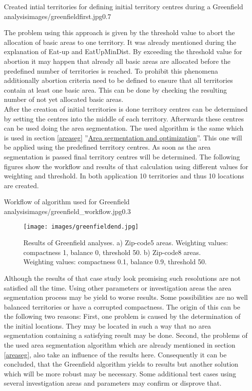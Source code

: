 \begin{figurevarSize}{Created intial territories for defining initial territory centres during a Greenfield analysis}{images/greenfieldfirst.jpg}{0.7}\end{figurevarSize}


The problem using this approach is given by the threshold value to abort the allocation of basic areas to one territory. It was already mentioned during the explanation of Eat-up and EatUpMinDist. By exceeding the threshold value for abortion it may happen that already all basic areas are allocated before the predefined number of territories is reached. To prohibit this phenomena additionally abortion criteria need to be defined to ensure that all territories contain at least one basic area. This can be done by checking the resulting number of not yet allocated basic areas. \\
After the creation of initial territories is done territory centres can be determined by setting the centres into the middle of each territory. Afterwards these centres can be used doing the area segmentation. The used  algorithm is the same which is used in section \ref{areaseg} ''\hyperref[areaseg]{Area segmentation and optimization}''. This one will be applied using the predefined territory centres. As soon as the area segmentation is passed final territory centres will be determined. The following figures show the workflow and results of that calculation using different values for weighting and threshold. In both application 10 territories and thus 10 locations are created.

\begin{figurevarSize}{Workflow of algorithm used for Greenfield analysis}{images/greenfield_workflow.jpg}{0.3}\end{figurevarSize}

\begin{figure}[H]
	\centering
	\texttt{[image: images/greenfieldend.jpg]}
	\caption[Results of Greenfield analyses. ]{Results of Greenfield analyses. a) Zip-code5 areas. Weighting values: compactness 1, balance 0, threshold 50. b) Zip-code8 areas. Weighting values: compactness 0.1, balance 0.9, threshold 50.}
\end{figure}

Although the results of that case study look promising such resolutions are not satisfied all the time. Using other parameters or investigation areas the area segmentation process may be yield to worse results. Some possibilities are no well balanced territories or have a corrupted compactness. The origin of this can be the following two reasons: First, one problem is caused by the determination of the initial locations. They may be located in such a way that no area segmentation containing a satisfying result may be done. Second, the problems of the used area segmentation algorithm which are already mentioned in section \ref{areaseg}, also take an influence of the results here. Consequently it can be concluded, that the Greenfield algorithm yields to results but another solution which will be more robust may be necessary. Some additional test cases using several investigation areas and parameters may confirm or disprove that.

